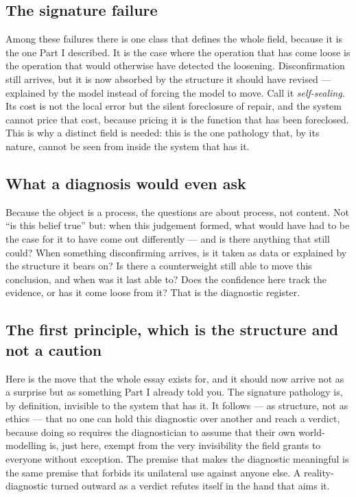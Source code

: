 \documentclass{article}
\begin{document}
\subsection*{The signature failure}
Among these failures there is one class that defines the whole field, because it is the one Part I described. It is the case where the operation that has come loose is the operation that would otherwise have detected the loosening. Disconfirmation still arrives, but it is now absorbed by the structure it should have revised --- explained by the model instead of forcing the model to move. Call it \textit{self-sealing}. Its cost is not the local error but the silent foreclosure of repair, and the system cannot price that cost, because pricing it is the function that has been foreclosed. This is why a distinct field is needed: this is the one pathology that, by its nature, cannot be seen from inside the system that has it.

\subsection*{What a diagnosis would even ask}
Because the object is a process, the questions are about process, not content. Not ``is this belief true'' but: when this judgement formed, what would have had to be the case for it to have come out differently --- and is there anything that still could? When something disconfirming arrives, is it taken as data or explained by the structure it bears on? Is there a counterweight still able to move this conclusion, and when was it last able to? Does the confidence here track the evidence, or has it come loose from it? That is the diagnostic register.

\subsection*{The first principle, which is the structure and not a caution}
Here is the move that the whole essay exists for, and it should now arrive not as a surprise but as something Part I already told you. The signature pathology is, by definition, invisible to the system that has it. It follows --- as structure, not as ethics --- that no one can hold this diagnostic over another and reach a verdict, because doing so requires the diagnostician to assume that their own world-modelling is, just here, exempt from the very invisibility the field grants to everyone without exception. The premise that makes the diagnostic meaningful is the same premise that forbids its unilateral use against anyone else. A reality-diagnostic turned outward as a verdict refutes itself in the hand that aims it.
\end{document}
